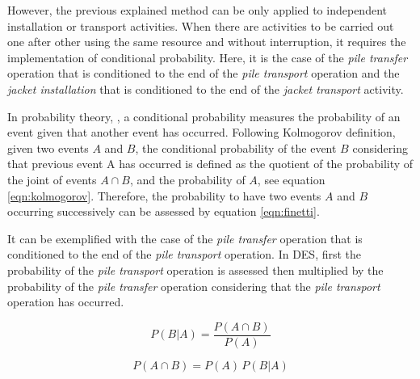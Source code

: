 However, the previous explained method can be only applied to independent installation or transport activities. When there are activities to be carried out one after other using the same resource and without interruption, it requires the implementation of conditional probability. Here, it is the case of the \textit{pile transfer} operation that is conditioned to the end of the \textit{pile transport} operation and the \textit{jacket installation} that is conditioned to the end of the \textit{jacket transport} activity.

In probability theory, \cite{Thalemann2012}, a conditional probability measures the probability of an event given that another event has occurred. Following Kolmogorov definition, given two events $A$ and $B$, the conditional probability of the event $B$ considering that previous event A has occurred is defined as the quotient of the probability of the joint of events $A \cap B$, and the probability of $A$, see equation \ref{eqn:kolmogorov}. Therefore, the probability to have two events $A$ and $B$ occurring successively can be assessed by equation \ref{eqn:finetti}.

It can be exemplified with the case of the \textit{pile transfer} operation that is conditioned to the end of the \textit{pile transport} operation. In DES, first the probability of the \textit{pile transport} operation is assessed then multiplied by the probability of the \textit{pile transfer} operation considering that the \textit{pile transport} operation has occurred.

\begin{equation}
\label{eqn:kolmogorov}
P \left(B \vert A \right) = \frac{P \left(A \cap B \right)}{P \left( A \right)}
\end{equation}

\begin{equation}
\label{eqn:finetti}
P \left(A \cap B \right) = P \left( A \right)\, P \left(B \vert A \right)
\end{equation}


